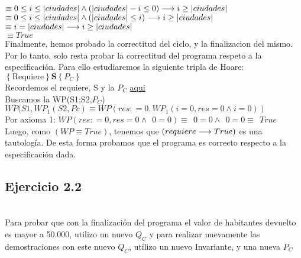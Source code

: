 \documentclass[10pt,a4paper]{article}
\begin{document}
$\equiv 0 \leq i \leq |ciudades| \land (|ciudades|-i \leq 0) \longrightarrow i \geq |ciudades|$ \\

$\equiv 0 \leq i \leq |ciudades| \land (|ciudades| \leq i) \longrightarrow i \geq |ciudades|$ \\

$\equiv i = |ciudades| \longrightarrow i \geq |ciudades|$\\

$\equiv True$ \checkmark \\

Finalmente, hemos probado la correctitud del ciclo, y la finalizacion del mismo. Por lo tanto, solo resta probar la correctitud del programa respeto a la especificación. Para ello estudiaremos la siguiente tripla de Hoare: $
\left\{\text{Requiere}\right\} \mathbf{S} \left\{P_C\right\}$ \\

Recordemos el requiere, S y la $P_C$ \hyperref[PC]{aqui} \\ 

Buscamos la WP(S1;S2,$P_C$) \equiv $WP(S1, WP_1(S2, Pc) \equiv WP(res: = 0, WP_1(i= 0, res = 0 \land i = 0))$\\

Por axioma 1: $WP(res: = 0, res = 0 \land \ \ 0 = 0) \equiv \ \ 0 = 0 \land \ \ 0 = 0 \equiv\ \ True$ \\

Luego, como $(WP \equiv True)$, tenemos que $(requiere \longrightarrow True)$ es una tautología.
De esta forma probamos que el programa es correcto respecto a la especificación dada.


\subsection{Ejercicio 2.2}\\

Para probar que con la finalización del programa el valor de habitantes devuelto es mayor a 50.000, utilizo un nuevo $Q_C$ y para realizar nuevamente las demostraciones con este nuevo $Q_C$, utilizo un nuevo Invariante, y una nueva $P_C$ \\
\end{document}
